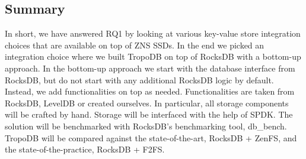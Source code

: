 \subsection{Summary}
In short, we have answered RQ1 by looking at various key-value store integration choices that are available on top of ZNS SSDs. In the end we picked an integration choice where we built TropoDB on top of RocksDB with a bottom-up approach. In the bottom-up approach we start with the database interface from RocksDB, but do not start with any additional RocksDB logic by default. Instead, we add functionalities on top as needed. Functionalities are taken from RocksDB, LevelDB or created ourselves. In particular, all storage components will be crafted by hand. Storage will be interfaced with the help of SPDK. The solution will be benchmarked with RocksDB's benchmarking tool, db\_bench. TropoDB will be compared against the state-of-the-art, RocksDB + ZenFS, and the state-of-the-practice, RocksDB + F2FS.
